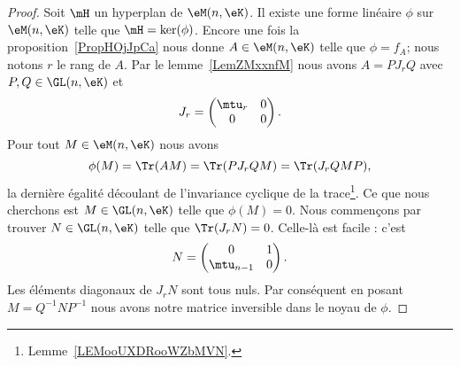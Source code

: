 \begin{proof}
	Soit \( \mH\) un hyperplan de \( \eM(n,\eK)\). Il existe une forme linéaire \( \phi\) sur \( \eM(n,\eK)\) telle que \( \mH=\ker(\phi)\). Encore une fois la proposition~\ref{PropHOjJpCa} nous donne \( A\in \eM(n,\eK)\) telle que \( \phi=f_A\); nous notons \( r\) le rang de \( A\). Par le lemme~\ref{LemZMxxnfM} nous avons \( A=PJ_rQ\) avec \( P,Q\in \GL(n,\eK)\) et
	\begin{equation}
		J_r=\begin{pmatrix}
			\mtu_r & 0 \\
			0      & 0
		\end{pmatrix}.
	\end{equation}
	Pour tout \( M\in \eM(n,\eK)\) nous avons
	\begin{equation}
		\phi(M)=\Tr(AM)=\Tr(PJ_rQM)=\Tr(J_rQMP),
	\end{equation}
	la dernière égalité découlant de l'invariance cyclique de la trace\footnote{Lemme~\ref{LEMooUXDRooWZbMVN}.}. Ce que nous cherchons est \( M\in \GL(n,\eK)\) telle que \( \phi(M)=0\). Nous commençons par trouver \( N\in\GL(n,\eK)\) telle que \( \Tr(J_rN)=0\). Celle-là est facile : c'est
	\begin{equation}
		N=\begin{pmatrix}
			0          & 1 \\
			\mtu_{n-1} & 0
		\end{pmatrix}.
	\end{equation}
	Les éléments diagonaux de \( J_rN\) sont tous nuls. Par conséquent en posant \( M=Q^{-1}NP^{-1}\) nous avons notre matrice inversible dans le noyau de \( \phi\).
\end{proof}
